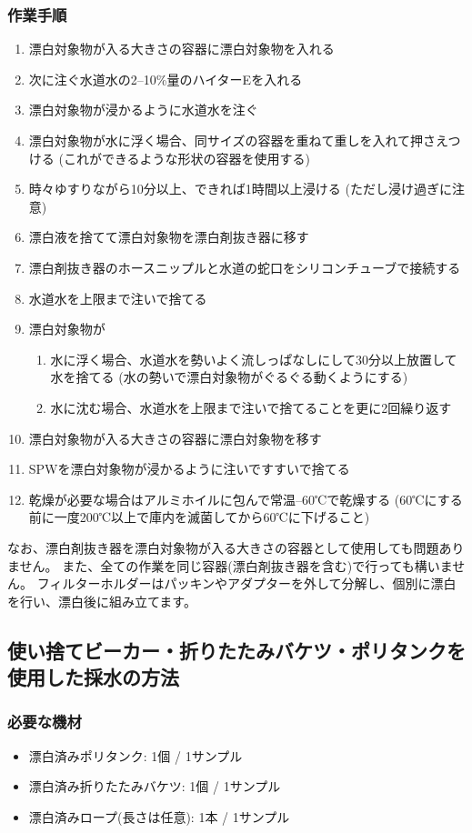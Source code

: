 \documentclass[titlepage,10pt,a4paper,uplatex]{jsbook}
\begin{document}
\subsubsection{作業手順}
\begin{enumerate}
\item 漂白対象物が入る大きさの容器に漂白対象物を入れる
\item 次に注ぐ水道水の2--10\%量のハイターEを入れる
\item 漂白対象物が浸かるように水道水を注ぐ
\item 漂白対象物が水に浮く場合、同サイズの容器を重ねて重しを入れて押さえつける (これができるような形状の容器を使用する)
\item 時々ゆすりながら10分以上、できれば1時間以上浸ける (ただし浸け過ぎに注意)
\item 漂白液を捨てて漂白対象物を漂白剤抜き器に移す
\item 漂白剤抜き器のホースニップルと水道の蛇口をシリコンチューブで接続する
\item 水道水を上限まで注いで捨てる
\item 漂白対象物が
\begin{enumerate}
\item 水に浮く場合、水道水を勢いよく流しっぱなしにして30分以上放置して水を捨てる (水の勢いで漂白対象物がぐるぐる動くようにする)
\item 水に沈む場合、水道水を上限まで注いで捨てることを更に2回繰り返す
\end{enumerate}
\item 漂白対象物が入る大きさの容器に漂白対象物を移す
\item SPWを漂白対象物が浸かるように注いですすいで捨てる
\item 乾燥が必要な場合はアルミホイルに包んで常温--60℃で乾燥する (60℃にする前に一度200℃以上で庫内を滅菌してから60℃に下げること)
\end{enumerate}

なお、漂白剤抜き器を漂白対象物が入る大きさの容器として使用しても問題ありません。
また、全ての作業を同じ容器(漂白剤抜き器を含む)で行っても構いません。
フィルターホルダーはパッキンやアダプターを外して分解し、個別に漂白を行い、漂白後に組み立てます。

\subsection{使い捨てビーカー・折りたたみバケツ・ポリタンクを使用した採水の方法}

\subsubsection{必要な機材}
\begin{itemize}
\item 漂白済みポリタンク: 1個 / 1サンプル
\item 漂白済み折りたたみバケツ: 1個 / 1サンプル
\item 漂白済みロープ(長さは任意): 1本 / 1サンプル
\end{itemize}
\end{document}
